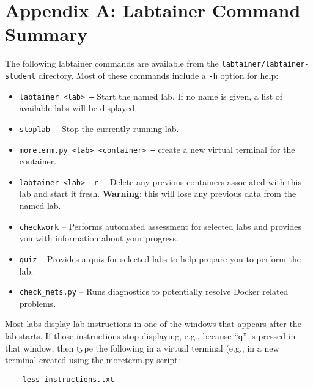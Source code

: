 \documentclass[12pt]{article}
\begin{document}
\section* {Appendix A: Labtainer Command Summary}
\label{sec:appendixA}
The following labtainer commands are available from the \texttt{labtainer/labtainer-student}
directory.  Most of these commands include a {\tt -h} option for help:
\begin{itemize}
\item \texttt{labtainer <lab> --}
Start the named lab.  If no name is given, a list of available labs will be displayed.
\item \texttt{stoplab  --} Stop the currently running lab.
\item \texttt{moreterm.py <lab> <container> --} create a new virtual terminal for the container.
\item \texttt{labtainer <lab> -r --}
Delete any previous containers associated with this lab and start it fresh.  \textbf{Warning}: this will lose any
previous data from the named lab.
\item \texttt{checkwork} -- Performs automated assessment for selected labs and provides you with information about your progress.
\item \texttt{quiz} -- Provides a quiz for selected labs to help prepare you to perform the lab.
\item \texttt{check\_nets.py} -- Runs diagnostics to potentially resolve Docker related problems.

\end{itemize}

Most labs display lab instructions in one of the windows that appears after the lab starts.  If those instructions
stop displaying, e.g., because ``q'' is pressed in that window, then type the following in a virtual terminal (e.g.,
in a new terminal created using the moreterm.py script:
\begin{verbatim}
    less instructions.txt
\end{verbatim}
\end{document}
